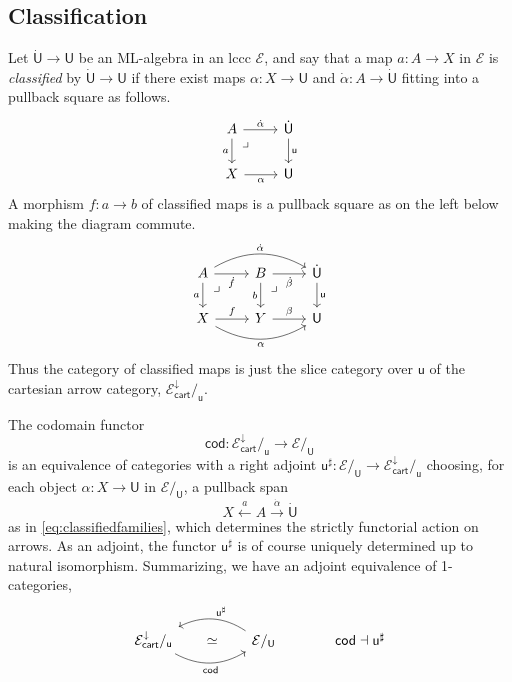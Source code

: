 \documentclass[12pt,reqno]{amsart}
\newcommand{\EE}{\ensuremath{\mathcal{E}}}
\renewcommand{\to}{\ensuremath{\rightarrow}}
\newcommand{\too}{\ensuremath{\longrightarrow}}
\renewcommand{\t}{\ensuremath{\mathsf{u}}}
\newcommand{\T}{\ensuremath{\mathsf{U}}}
\newcommand{\TT}{\ensuremath{\dot{\mathsf{U}}}}
\newcommand{\pbcorner}{\arrow[dr,phantom,"\lrcorner" very near start, shift right=.5ex]} %
\theoremstyle{remark}
\theoremstyle{definition}
\begin{document}
\subsection{Classification}\label{sec:classify}

Let $\TT \to \T$ be an ML-algebra in an lccc $\EE$, and say that a map $a : A\to X$ in $\EE$ is \emph{classified} by $\TT \to \T$ if there exist maps $\alpha : X \to \T$ and $\dot{\alpha} : A \to \TT$ fitting into a pullback square as follows.
\begin{equation}\label{eq:classifiedfamilies}
\begin{tikzcd}
	 A \ar[d, swap, "a"] \pbcorner \ar[r, "\dot{\alpha}"] & \TT \ar[d, "\t"] \\  
	X \ar[r, swap, "\alpha"] & \T 
 \end{tikzcd}
 \end{equation}
 A morphism $f : a \to b$ of classified maps is a pullback square as on the left below making the diagram commute.
 \begin{equation}\label{eq:classifiedfamilies2}
\begin{tikzcd}
	A \ar[d,swap, "a"] \ar[r,swap, "\dot{f}"]  \ar[rr, bend left, "\dot{\alpha}"]  \pbcorner & B \ar[d,swap, "b"]   \ar[r,swap,  "\dot{\beta}"] \pbcorner & \TT \ar[d, "\t"]  \\  
	X \ar[r, "f"] \ar[rr,swap, bend right, "\alpha"] & Y  \ar[r, "{\beta}"] &  \T
 \end{tikzcd}
 \end{equation}
 Thus the category of classified maps is just the slice category over $\t$ of the cartesian arrow category, $\EE^{\downarrow}_{\mathsf{cart}}/_{\t}$.

The codomain functor
\[
\mathsf{cod} : \EE^{\downarrow}_{\mathsf{cart}}/_{\t} \too \EE/_\T
\]
is an equivalence of categories with a right adjoint $\t^{\sharp} : \EE/_\T \to \EE^{\downarrow}_{\mathsf{cart}}/_{\t}$ choosing, for each object $\alpha : X \to \T$ in $\EE/_\T$, a pullback span $$X \stackrel{a}{\leftarrow} A \stackrel{\dot{\alpha}}{\to} \TT$$ as in \eqref{eq:classifiedfamilies}, which determines the strictly functorial action on arrows.  As an adjoint, the functor $\t^{\sharp}$ is of course uniquely determined up to natural isomorphism.  Summarizing, we have an adjoint equivalence of 1-categories,
 \begin{equation}\label{eq:slice adjunction}
\begin{tikzcd}
 {\EE^{\downarrow}_{\mathsf{cart}}/_{\t}}  \ar[rr, bend right, swap, "{\mathsf{cod} }"] \ar[rr, phantom, description, "{\simeq}"] && \ar[ll, bend right, swap, "{\t^{\sharp}}"] \EE/_\T & \quad \mathsf{cod} \dashv \t^{\sharp}
 \end{tikzcd}
 \end{equation}
\end{document}
